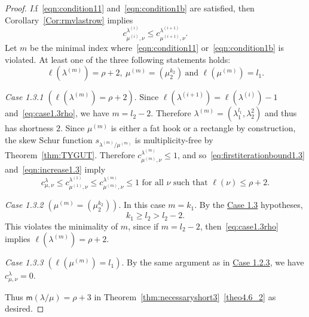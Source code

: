 \documentclass[10pt]{article}
\theoremstyle{definition}
\newcommand{\msf}{\mathsf{m}}
\let\hypertargeta\hypertarget %
\let\hyperlinka\hyperlink %
\newenvironment{Case}[1]{\par\vskip2pt\noindent%
\emph{#1}.}{\vskip2pt}
\begin{document}
\begin{proof}
\begin{Case}
If~\eqref{eqn:condition11} and~\eqref{eqn:condition1b} are satisfied, then Corollary~\ref{Cor:rmvlastrow} implies
\begin{equation}\label{eqn:increase1.3}
 c^{\lambda^{(i)}}_{\mu^{(i)},\nu} \leq c^{\lambda^{(i+1)}}_{\mu^{(i+1)},\nu}.
\end{equation}
Let $m$ be the minimal index where~\eqref{eqn:condition11} or~\eqref{eqn:condition1b} is violated. At least one of the three following statements holds: 
\[
\ell(\lambda^{(m)}) = \rho+2,\ \mu^{(m)} = (\mu_2^{k_2})\ \text{and } \ell(\mu^{(m)}) = l_1.
\]
\end{Case}

\begin{Case}
{\hypertargeta{theo4.6_case1.3.1}{Case 1.3.1} $(\ell(\lambda^{(m)}) = \rho+2)$} 
Since $\ell(\lambda^{(i+1)}) = \ell(\lambda^{(i)})-1$ and~\eqref{eq:case1.3rho}, we have $m = l_2-2$. Therefore $\lambda^{(m)} = (\lambda_1^{l_1},\lambda_2^{2})$ and thus has shortness $2$. Since $\mu^{(m)}$ is either a fat hook or a rectangle by construction, the skew Schur function $s_{\lambda^{(m)}/\mu^{(m)}}$ is multiplicity-free by Theorem~\ref{thm:TYGUT}. Therefore $c^{\lambda^{(m)}}_{\mu^{(m)},\nu} \leq 1$, and so~\eqref{eq:firstiterationbound1.3} and~\eqref{eqn:increase1.3} imply
\[
c^{\lambda}_{\mu,\nu} \leq c^{\lambda^{(1)}}_{\mu^{(1)},\nu}\leq c^{\lambda^{(m)}}_{\mu^{(m)},\nu} \leq 1\text{ for all }\nu\text{ such that }\ell(\nu)\leq \rho+2.
\]
\end{Case}

\begin{Case}
{\hypertargeta{theo4.6_case1.3.2}{Case 1.3.2} $(\mu^{(m)} = (\mu_2^{k_2}))$} 
In this case $m = k_1$. By the \hyperlinka{theo4.6_case1.3}{Case 1.3} hypotheses,
\[
k_1 \geq l_2 > l_2-2.
\]
This violates the minimality of $m$, since if $m=l_2 - 2$, then~\eqref{eq:case1.3rho} implies $\ell(\lambda^{(m)}) = \rho+2$.
\end{Case}

\begin{Case}
{\hypertargeta{theo4.6_case1.3.3}{Case 1.3.3} $(\ell(\mu^{(m)}) = l_1)$} 
By the same argument as in \hyperlinka{theo4.6_case1.2.3}{Case 1.2.3}, we have $c^{\lambda}_{\mu,\nu} = 0$. 

Thus ${\msf }(\lambda/\mu) = \rho+3$ in Theorem~\ref{thm:necessaryshort3}~\ref{theo4.6_2} as desired.
\end{Case}


\end{proof}
\end{document}
